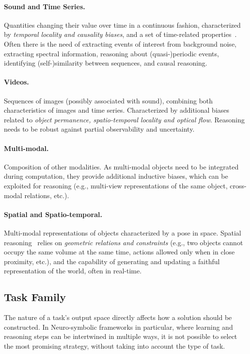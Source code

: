 \paragraph{Sound and Time Series.} Quantities changing their value over time in a continuous fashion, characterized by \textit{temporal locality and causality biases}, and a set of time-related properties~\cite{yan2022neuro}. Often there is the need of extracting events of interest from background noise, extracting spectral information, reasoning about (quasi-)periodic events, identifying (self-)similarity between sequences, and causal reasoning.

\paragraph{Videos.} Sequences of images (possibly associated with sound), combining both characteristics of images and time series. Characterized by additional biases related to \textit{object permanence, spatio-temporal locality and optical flow}. %
Reasoning needs to be robust against partial observability and uncertainty.

\paragraph{Multi-modal.} Composition of other modalities. As multi-modal objects need to be integrated during computation, they provide additional inductive biases, which can be exploited for reasoning (e.g., multi-view representations of the same object, cross-modal relations, etc.).

\paragraph{Spatial and Spatio-temporal.} Multi-modal representations of objects characterized by a pose in space. Spatial reasoning~\cite{lee2023neuro} relies on \textit{geometric relations and constraints} (e.g., two objects cannot occupy the same volume at the same time, actions allowed only when in close proximity, etc.), and the capability of generating and updating a faithful representation of the world, often in real-time.


\subsection{Task Family}
The nature of a task's output space directly affects how a solution should be constructed. In Neuro-symbolic frameworks in particular, where learning and reasoning steps can be intertwined in multiple ways, it is not possible to select the most promising strategy, without taking into account the type of task.
%

